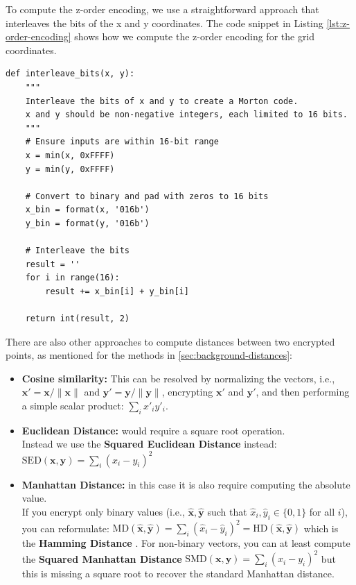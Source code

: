 To compute the z-order encoding, we use a straightforward approach that interleaves the bits of the x and y coordinates. The code snippet in Listing \ref{lst:z-order-encoding} shows how we compute the z-order encoding for the grid coordinates.

\begin{lstlisting}[caption={Z-order encoding for grid coordinates}, label={lst:z-order-encoding}]
def interleave_bits(x, y):
    """
    Interleave the bits of x and y to create a Morton code.
    x and y should be non-negative integers, each limited to 16 bits.
    """
    # Ensure inputs are within 16-bit range
    x = min(x, 0xFFFF)
    y = min(y, 0xFFFF)
    
    # Convert to binary and pad with zeros to 16 bits
    x_bin = format(x, '016b')
    y_bin = format(y, '016b')
    
    # Interleave the bits
    result = ''
    for i in range(16):
        result += x_bin[i] + y_bin[i]
    
    return int(result, 2)
\end{lstlisting}

\label{lst:distance-computation-tricks}

There are also other approaches to compute distances between two encrypted points\cite{ibarrond2022hedistancetricks}, as mentioned for the methods in \cref{sec:background-distances}:
\begin{itemize}
    \item \textbf{Cosine similarity:} This can be resolved by normalizing the vectors, i.e., $\mathbf{x}' = \mathbf{x} / \|\mathbf{x}\|$ and $\mathbf{y}' = \mathbf{y} / \|\mathbf{y}\|$, encrypting $\mathbf{x}'$ and $\mathbf{y}'$, and then performing a simple scalar product: $\sum_i x'_i y'_i$.
    
    \item \textbf{Euclidean Distance:} would require a square root operation.\\
    Instead we use the \textbf{Squared Euclidean Distance} instead:
    $
    \mathrm{SED}(\mathbf{x}, \mathbf{y}) = \sum_i (x_i - y_i)^2
    $
    
    \item \textbf{Manhattan Distance:} in this case it is also require computing the absolute value.\\
    If you encrypt only binary values (i.e., $\hat{\mathbf{x}}, \hat{\mathbf{y}}$ such that $\hat{x}_i, \hat{y}_i \in \{0,1\}$ for all $i$), you can reformulate:
    $
    \mathrm{MD}(\hat{\mathbf{x}}, \hat{\mathbf{y}}) = \sum_i (\hat{x}_i - \hat{y}_i)^2 = \mathrm{HD}(\hat{\mathbf{x}}, \hat{\mathbf{y}})
    $
    which is the \textbf{Hamming Distance} . For non-binary vectors, you can at least compute the \textbf{Squared Manhattan Distance}
    $
    \mathrm{SMD}(\mathbf{x}, \mathbf{y}) = \sum_i (x_i - y_i)^2
    $
    but this is missing a square root to recover the standard Manhattan distance.
    
\end{itemize}

